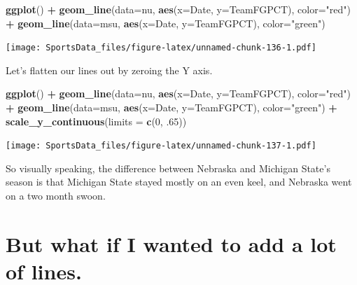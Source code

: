 \documentclass[]{book}
\newenvironment{Shaded}{\begin{snugshade}}{\end{snugshade}}
\newcommand{\DataTypeTok}[1]{\textcolor[rgb]{0.13,0.29,0.53}{#1}}
\newcommand{\DecValTok}[1]{\textcolor[rgb]{0.00,0.00,0.81}{#1}}
\newcommand{\FloatTok}[1]{\textcolor[rgb]{0.00,0.00,0.81}{#1}}
\newcommand{\KeywordTok}[1]{\textcolor[rgb]{0.13,0.29,0.53}{\textbf{#1}}}
\newcommand{\NormalTok}[1]{#1}
\newcommand{\OperatorTok}[1]{\textcolor[rgb]{0.81,0.36,0.00}{\textbf{#1}}}
\newcommand{\StringTok}[1]{\textcolor[rgb]{0.31,0.60,0.02}{#1}}
\begin{document}
\begin{Shaded}
\begin{Highlighting}[]
\KeywordTok{ggplot}\NormalTok{() }\OperatorTok{+}\StringTok{ }\KeywordTok{geom_line}\NormalTok{(}\DataTypeTok{data=}\NormalTok{nu, }\KeywordTok{aes}\NormalTok{(}\DataTypeTok{x=}\NormalTok{Date, }\DataTypeTok{y=}\NormalTok{TeamFGPCT), }\DataTypeTok{color=}\StringTok{"red"}\NormalTok{) }\OperatorTok{+}\StringTok{ }\KeywordTok{geom_line}\NormalTok{(}\DataTypeTok{data=}\NormalTok{msu, }\KeywordTok{aes}\NormalTok{(}\DataTypeTok{x=}\NormalTok{Date, }\DataTypeTok{y=}\NormalTok{TeamFGPCT), }\DataTypeTok{color=}\StringTok{"green"}\NormalTok{)}
\end{Highlighting}
\end{Shaded}

\texttt{[image: SportsData\_files/figure-latex/unnamed-chunk-136-1.pdf]}

Let's flatten our lines out by zeroing the Y axis.

\begin{Shaded}
\begin{Highlighting}[]
\KeywordTok{ggplot}\NormalTok{() }\OperatorTok{+}\StringTok{ }\KeywordTok{geom_line}\NormalTok{(}\DataTypeTok{data=}\NormalTok{nu, }\KeywordTok{aes}\NormalTok{(}\DataTypeTok{x=}\NormalTok{Date, }\DataTypeTok{y=}\NormalTok{TeamFGPCT), }\DataTypeTok{color=}\StringTok{"red"}\NormalTok{) }\OperatorTok{+}\StringTok{ }\KeywordTok{geom_line}\NormalTok{(}\DataTypeTok{data=}\NormalTok{msu, }\KeywordTok{aes}\NormalTok{(}\DataTypeTok{x=}\NormalTok{Date, }\DataTypeTok{y=}\NormalTok{TeamFGPCT), }\DataTypeTok{color=}\StringTok{"green"}\NormalTok{) }\OperatorTok{+}\StringTok{ }\KeywordTok{scale_y_continuous}\NormalTok{(}\DataTypeTok{limits =} \KeywordTok{c}\NormalTok{(}\DecValTok{0}\NormalTok{, }\FloatTok{.65}\NormalTok{))}
\end{Highlighting}
\end{Shaded}

\texttt{[image: SportsData\_files/figure-latex/unnamed-chunk-137-1.pdf]}

So visually speaking, the difference between Nebraska and Michigan State's season is that Michigan State stayed mostly on an even keel, and Nebraska went on a two month swoon.

\hypertarget{but-what-if-i-wanted-to-add-a-lot-of-lines.}{%
\section{But what if I wanted to add a lot of lines.}\label{but-what-if-i-wanted-to-add-a-lot-of-lines.}}
\end{document}
